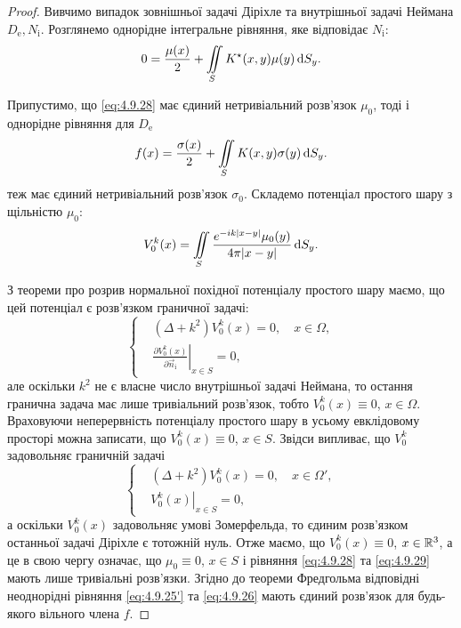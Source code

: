 \begin{proof}
	Вивчимо випадок зовнішньої задачі Діріхле та внутрішньої задачі Неймана $D_{\text{e}}, N_{\text{i}}$. Розглянемо однорідне інтегральне рівняння, яке відповідає $N_{\text{i}}$:
	\begin{equation}
		\label{eq:4.9.28}
		0 = \frac{\mu(x)}{2} + \displaystyle\iint\limits_S K^\star(x, y) \mu(y) \mathop{}\!\mathrm{d} S_y. 
	\end{equation}

	Припустимо, що \eqref{eq:4.9.28} має єдиний нетривіальний розв'язок $\mu_0$, тоді і однорідне рівняння для $D_{\text{e}}$
	\begin{equation}
		\label{eq:4.9.29}
		f(x) = \frac{\sigma(x)}{2} + \displaystyle\iint\limits_S K(x, y) \sigma(y) \mathop{}\!\mathrm{d} S_y. 
	\end{equation}
	теж має єдиний нетривіальний розв'язок $\sigma_0$. Складемо потенціал простого шару з щільністю $\mu_0$:
	\begin{equation}
		V_0^k(x) = \displaystyle\iint\limits_S \frac{e^{-ik|x-y|}\mu_0(y)}{4\pi|x-y|}\mathop{}\!\mathrm{d} S_y.	
	\end{equation}

	З теореми про розрив нормальної похідної потенціалу простого шару маємо, що цей потенціал є розв'язком граничної задачі:
	\begin{equation}
		\left\{
			\begin{aligned}
				& (\Delta + k^2) V_0^k(x) = 0, \quad x \in \Omega, \\
				& \left. \frac{\partial V_0^k(x)}{\partial \vec n_{\text{i}}} \right|_{x \in S} = 0,
			\end{aligned}
		\right.
	\end{equation}
	але оскільки $k^2$ не є власне число внутрішньої задачі Неймана, то остання гранична задача має лише тривіальний розв'язок, тобто $V_0^k(x) \equiv 0$, $x \in \Omega$. Враховуючи неперервність потенціалу простого шару в усьому евклідовому просторі можна записати, що $V_0^k(x) \equiv 0$, $x \in S$. Звідси випливає, що $V_0^k$ задовольняє граничній задачі
	\begin{equation}
		\left\{
			\begin{aligned}
				& (\Delta + k^2) V_0^k(x) = 0, \quad x \in \Omega', \\
				& \left. V_0^k(x) \right|_{x \in S} = 0,
			\end{aligned}
		\right.
	\end{equation}
	а оскільки $V_0^k(x)$ задовольняє умові Зомерфельда, то єдиним розв'язком останньої задачі Діріхле є тотожній нуль. Отже маємо, що $V_0^k(x) \equiv 0$, $x \in \mathbb{R}^3$, а це в свою чергу означає, що $\mu_0 \equiv 0$, $x \in S$ і рівняння \eqref{eq:4.9.28} та \eqref{eq:4.9.29} мають лише тривіальні розв'язки. Згідно до теореми Фредгольма відповідні неоднорідні рівняння \eqref{eq:4.9.25'} та \eqref{eq:4.9.26} мають єдиний розв'язок для будь-якого вільного члена $f$.
\end{proof}

